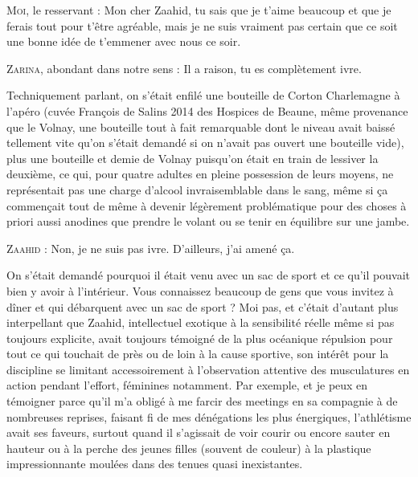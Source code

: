 \begin{dialogue}

\textsc{Moi}, le resservant : Mon cher Zaahid, tu sais que je t’aime beaucoup et que je ferais tout pour t’être agréable, mais je ne suis vraiment pas certain que ce soit une bonne idée de t’emmener avec nous ce soir.

\textsc{Zarina}, abondant dans notre sens : Il a raison, tu es complètement ivre.

\end{dialogue}

Techniquement parlant, on s’était enfilé une bouteille de Corton Charlemagne à l’apéro (cuvée François de Salins 2014 des Hospices de Beaune, même provenance que le Volnay, une bouteille tout à fait remarquable dont le niveau avait baissé tellement vite qu’on s’était demandé si on n’avait pas ouvert une bouteille vide), plus une bouteille et demie de Volnay puisqu’on était en train de lessiver la deuxième, ce qui, pour quatre adultes en pleine possession de leurs moyens, ne représentait pas une charge d’alcool invraisemblable dans le sang, même si ça commençait tout de même à devenir légèrement problématique pour des choses à priori aussi anodines que prendre le volant ou se tenir en équilibre sur une jambe.

\begin{dialogue}
    
\textsc{Zaahid} : Non, je ne suis pas ivre. D’ailleurs, j’ai amené ça.
    
\end{dialogue}

On s’était demandé pourquoi il était venu avec un sac de sport et ce qu’il pouvait bien y avoir à l’intérieur. Vous connaissez beaucoup de gens que vous invitez à dîner et qui débarquent avec un sac de sport ? Moi pas, et c’était d’autant plus interpellant que Zaahid, intellectuel exotique à la sensibilité réelle même si pas toujours explicite, avait toujours témoigné de la plus océanique répulsion pour tout ce qui touchait de près ou de loin à la cause sportive, son intérêt pour la discipline se limitant accessoirement à l’observation attentive des musculatures en action pendant l’effort, féminines notamment. Par exemple, et je peux en témoigner parce qu’il m’a obligé à me farcir des meetings en sa compagnie à de nombreuses reprises, faisant fi de mes dénégations les plus énergiques, l’athlétisme avait ses faveurs, surtout quand il s’agissait de voir courir ou encore sauter en hauteur ou à la perche des jeunes filles (souvent de couleur) à la plastique impressionnante moulées dans des tenues quasi inexistantes.

